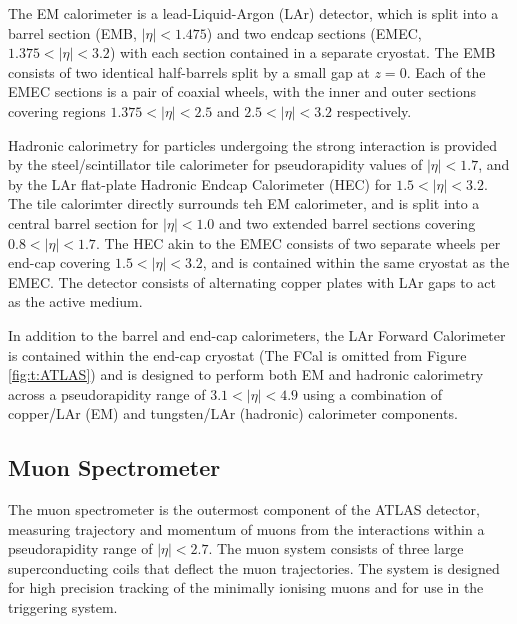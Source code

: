 		The EM calorimeter is a lead-Liquid-Argon (LAr) detector, which is split into a barrel section (EMB, $|\eta|<1.475$) and two endcap sections (EMEC, $1.375<|\eta|<3.2$) with each section contained in a separate cryostat. The EMB consists of two identical half-barrels split by a small gap at $z=0$. Each of the EMEC sections is a pair of coaxial wheels, with the inner and outer sections covering regions $1.375<|\eta|<2.5$ and $2.5<|\eta|<3.2$ respectively.

		Hadronic calorimetry for particles undergoing the strong interaction is provided by the steel/scintillator tile calorimeter for pseudorapidity values of $|\eta|<1.7$, and by the LAr flat-plate Hadronic Endcap Calorimeter (HEC) for $1.5<|\eta|<3.2$. The tile calorimter directly surrounds teh EM calorimeter, and is split into a central barrel section for $|\eta| < 1.0$ and two extended barrel sections covering $0.8<|\eta|<1.7$. The HEC akin to the EMEC consists of two separate wheels per end-cap covering $1.5<|\eta|<3.2$, and is contained within the same cryostat as the EMEC. The detector consists of alternating copper plates with LAr gaps to act as the active medium.

		In addition to the barrel and end-cap calorimeters, the LAr Forward Calorimeter is contained within the end-cap cryostat (The FCal is omitted from Figure \ref{fig:t:ATLAS}) and is designed to perform both EM and hadronic calorimetry across a pseudorapidity range of $3.1<|\eta|<4.9$ using a combination of copper/LAr (EM) and tungsten/LAr (hadronic) calorimeter components.

	\subsection{Muon Spectrometer}

		The muon spectrometer is the outermost component of the ATLAS detector, measuring trajectory and momentum of muons from the interactions within a pseudorapidity range of $|\eta| < 2.7$. The muon system consists of three large superconducting coils that deflect the muon trajectories. The system is designed for high precision tracking of the minimally ionising muons and for use in the triggering system.


